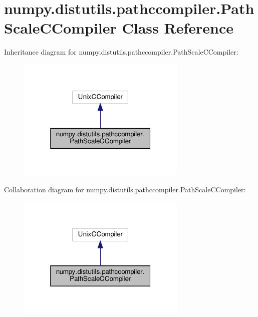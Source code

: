 \hypertarget{classnumpy_1_1distutils_1_1pathccompiler_1_1PathScaleCCompiler}{}\section{numpy.\+distutils.\+pathccompiler.\+Path\+Scale\+C\+Compiler Class Reference}
\label{classnumpy_1_1distutils_1_1pathccompiler_1_1PathScaleCCompiler}


Inheritance diagram for numpy.\+distutils.\+pathccompiler.\+Path\+Scale\+C\+Compiler\+:
\nopagebreak
\begin{figure}[H]
\begin{center}
\leavevmode
\includegraphics[width=229pt]{classnumpy_1_1distutils_1_1pathccompiler_1_1PathScaleCCompiler__inherit__graph}
\end{center}
\end{figure}


Collaboration diagram for numpy.\+distutils.\+pathccompiler.\+Path\+Scale\+C\+Compiler\+:
\nopagebreak
\begin{figure}[H]
\begin{center}
\leavevmode
\includegraphics[width=229pt]{classnumpy_1_1distutils_1_1pathccompiler_1_1PathScaleCCompiler__coll__graph}
\end{center}
\end{figure}
